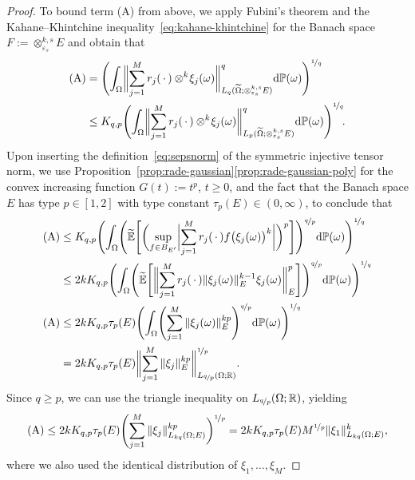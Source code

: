 \documentclass[10pt,a4paper]{amsart}
\newcommand{\Omegat}{\widetilde{\Omega}}
\newcommand{\bbE}{\mathbb{E}}
\newcommand{\bbEt}{\widetilde{\bbE}}
\newcommand{\bbP}{\mathbb{P}}
\newcommand{\bbR}{\mathbb{R}}
\newcommand{\dual}[1]{{#1}^{\prime}}
\newcommand{\norm}[2]{     \| #1       \|_{ #2 }}
\newcommand{\rd}{\mathrm{d}}
\newcommand{\xk}{\otimes^k}
\newcommand{\xkseps}{\otimes^{k,s}_{\varepsilon_s}}
\begin{document}
\begin{proof}
	To bound term (A) from above, 
	we apply Fubini's theorem and 
	the Kahane--Khintchine inequality~\eqref{eq:kahane-khintchine} 
	for the Banach space $F:=\xkseps E$ 
	and obtain that 
	\begin{align*} 
	\text{(A)} 
	&=
	\Biggl( 
	\int_\Omega 
	\biggl\| 
	\sum_{j=1}^M 
	r_j (\,\cdot\,) 
	\xk\! \xi_j(\omega)  
	\biggr\|_{L_q(\Omegat;\xkseps E)}^q  
	\rd\bbP(\omega)
	\Biggr)^{\nicefrac{1}{q}} 
	\\
	&\leq 
	K_{q,p} 
	\Biggl( 
	\int_\Omega 
	\biggl\| 
	\sum_{j=1}^M 
	r_j (\,\cdot\,) 
	\xk\! \xi_j(\omega) 
	\biggr\|_{L_p(\Omegat;\xkseps E)}^q  
	\rd\bbP(\omega)
	\Biggr)^{\nicefrac{1}{q}} \!. 
	\end{align*} 
	Upon inserting the definition~\eqref{eq:sepsnorm}  
	of the symmetric injective tensor norm,  
	we use Proposition~\ref{prop:rade-gaussian}\ref{prop:rade-gaussian-poly}
	for the convex increasing function $G(t) := t^p$, $t\geq0$,
	and 
	the fact that the Banach space $E$ has type $p\in[1,2]$ 
	with type constant $\tau_p(E)\in(0,\infty)$, 
	to conclude that 
	{\allowdisplaybreaks
	\begin{align*} 
	\text{(A)} 
	&\leq 
	K_{q,p} 
	\Biggl( 
	\int_\Omega 
	\Biggl( 
	\bbEt 
	\Biggl[ 
	\biggl( 
	\sup_{f\in B_{\dual{E}}} 
	\biggl| 
	\sum_{j=1}^M 
	r_j (\,\cdot\,) 
	f\bigl( \xi_j(\omega) \bigr)^k 
	\biggr| \biggr)^p 
	\Biggr] 
	\Biggr)^{\nicefrac{q}{p}} 
	\rd\bbP(\omega)
	\Biggr)^{\nicefrac{1}{q}}  
	\\
	&\leq  
	2 k K_{q,p}  
	\Biggl( 
	\int_\Omega 
	\Biggl( 
	\bbEt 
	\Biggl[ 
	\biggl\| 
	\sum_{j=1}^M 
	r_j (\,\cdot\,) 
	\norm{ \xi_j(\omega) }{E}^{k-1} 
	\xi_j(\omega)
	\biggr\|_E^p 
	\Biggr] 
	\Biggr)^{\nicefrac{q}{p}} 
	\rd\bbP(\omega)
	\Biggr)^{\nicefrac{1}{q}} 
	\\
	\text{(A)} 
	&\leq 
	2 k K_{q,p} \tau_p(E) 
	\Biggl( 
	\int_\Omega 
	\Biggl( 
	\sum_{j=1}^M 
	\norm{ \xi_j(\omega) }{E}^{kp} 
	\Biggr)^{\nicefrac{q}{p}} 
	\rd\bbP(\omega)
	\Biggr)^{\nicefrac{1}{q}} 
	\\
	&= 
	2 k K_{q,p} \tau_p(E) 
	\biggl\| 
	\sum_{j=1}^M 
	\norm{\xi_j}{E}^{kp} 
	\biggr\|_{L_{\nicefrac{q}{p}}(\Omega;\bbR)}^{\nicefrac{1}{p}}. 
	\end{align*} 
	Since} $q\geq p$, 
	we can use the triangle inequality 
	on $L_{\nicefrac{q}{p}}(\Omega;\bbR)$, yielding 
	\begin{equation}\label{eq:proof:thm:MC-k:A} 
	\text{(A)} 
	\leq 
	2 k K_{q,p} \tau_p(E) 
	\Biggl(  
	\sum_{j=1}^M 
	\norm{\xi_j}{L_{kq}(\Omega;E)}^{kp} 
	\biggr)^{\nicefrac{1}{p}} 
	=  
	2 k K_{q,p} \tau_p(E) 
	M^{\nicefrac{1}{p}} 
	\norm{\xi_1}{L_{kq}(\Omega; E)}^k, 
	\end{equation} 
	where we also used the  
	identical distribution of $\xi_1,\ldots,\xi_M$. 
	

\end{proof}
\end{document}
